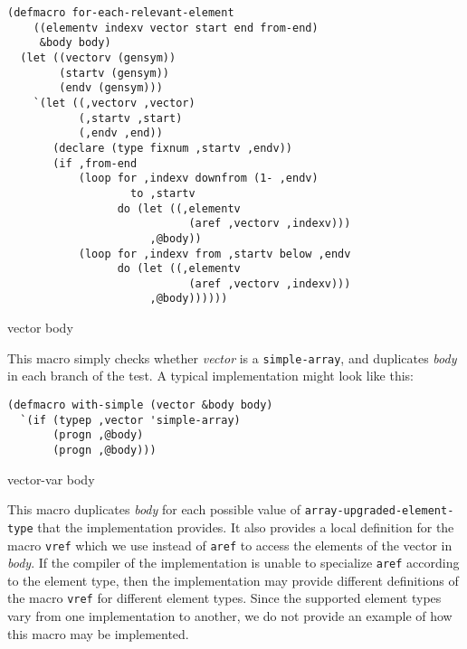{\small\begin{verbatim}
(defmacro for-each-relevant-element
    ((elementv indexv vector start end from-end)
     &body body)
  (let ((vectorv (gensym))
        (startv (gensym))
        (endv (gensym)))
    `(let ((,vectorv ,vector)
           (,startv ,start)
           (,endv ,end))
       (declare (type fixnum ,startv ,endv))
       (if ,from-end
           (loop for ,indexv downfrom (1- ,endv)
                   to ,startv
                 do (let ((,elementv
                            (aref ,vectorv ,indexv)))
                      ,@body))
           (loop for ,indexv from ,startv below ,endv
                 do (let ((,elementv
                            (aref ,vectorv ,indexv)))
                      ,@body))))))
\end{verbatim}}

 {vector \body body}

This macro simply checks whether \textit{vector} is a
\texttt{simple-array}, and duplicates \textit{body} in each branch of
the test.  A typical implementation might look like this:

{\small\begin{verbatim}
(defmacro with-simple (vector &body body)
  `(if (typep ,vector 'simple-array)
       (progn ,@body)
       (progn ,@body)))
\end{verbatim}}

 {vector-var \body body}

This macro duplicates \textit{body} for each possible value of
\texttt{array-upgraded-element-type} that the implementation provides.
It also provides a local definition for the macro \texttt{vref} which
we use instead of \texttt{aref} to access the elements of the vector
in \textit{body}.  If the compiler of the implementation is unable to
specialize \texttt{aref} according to the element type, then the
implementation may provide different definitions of the macro
\texttt{vref} for different element types.  Since the supported
element types vary from one implementation to another, we do not
provide an example of how this macro may be implemented.
